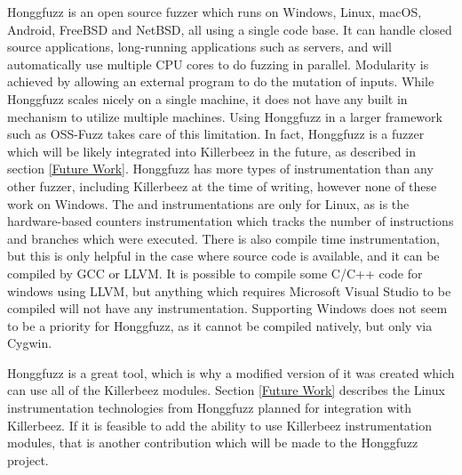 Honggfuzz\cite{honggfuzz} is an open source fuzzer which runs on Windows, Linux,
macOS, Android, FreeBSD and NetBSD, all using a single code base. It can handle
closed source applications, long-running applications such as servers, and will
automatically use multiple CPU cores to do fuzzing in parallel. Modularity is
achieved by allowing an external program to do the mutation of inputs. While
Honggfuzz scales nicely on a single machine, it does not have any built in
mechanism to utilize multiple machines.  Using Honggfuzz in a larger framework
such as OSS-Fuzz takes care of this limitation.  In fact, Honggfuzz is a fuzzer
which will be likely integrated into Killerbeez in the future, as described in
section \ref{Future Work}. Honggfuzz has more types of instrumentation than any
other fuzzer, including Killerbeez at the time of writing, however none of
these work on Windows. The \BTS{} and \IPT{} instrumentations are only for
Linux, as is the hardware-based counters instrumentation which tracks the
number of instructions and branches which were executed. There is also compile time
instrumentation, but this is only helpful in the case where source code is
available, and it can be compiled by GCC or LLVM.  It is possible to compile
some C/C++ code for windows using LLVM, but anything which requires Microsoft
Visual Studio to be compiled will not have any instrumentation.  Supporting
Windows does not seem to be a priority for Honggfuzz, as it cannot be compiled
natively, but only via Cygwin.

Honggfuzz is a great tool, which is why a modified version of it was created
which can use all of the Killerbeez modules.\cite{honggfuzzgrimm} Section
\ref{Future Work} describes the Linux instrumentation technologies from
Honggfuzz planned for integration with Killerbeez.
If it is feasible to add the ability to use
Killerbeez instrumentation modules, that is another contribution which will be
made to the Honggfuzz project.
